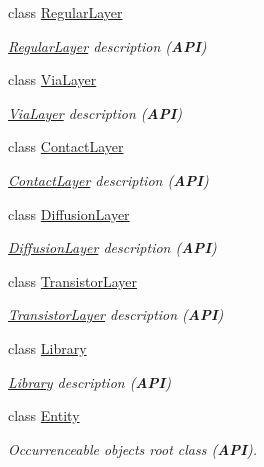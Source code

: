 \begin{DoxyCompactItemize}
class \hyperlink{classHurricane_1_1RegularLayer}{Regular\-Layer}
\begin{DoxyCompactList}\small\item\em \hyperlink{classHurricane_1_1RegularLayer}{Regular\-Layer} description ({\bfseries A\-P\-I}) \end{DoxyCompactList}\item 
class \hyperlink{classHurricane_1_1ViaLayer}{Via\-Layer}
\begin{DoxyCompactList}\small\item\em \hyperlink{classHurricane_1_1ViaLayer}{Via\-Layer} description ({\bfseries A\-P\-I}) \end{DoxyCompactList}\item 
class \hyperlink{classHurricane_1_1ContactLayer}{Contact\-Layer}
\begin{DoxyCompactList}\small\item\em \hyperlink{classHurricane_1_1ContactLayer}{Contact\-Layer} description ({\bfseries A\-P\-I}) \end{DoxyCompactList}\item 
class \hyperlink{classHurricane_1_1DiffusionLayer}{Diffusion\-Layer}
\begin{DoxyCompactList}\small\item\em \hyperlink{classHurricane_1_1DiffusionLayer}{Diffusion\-Layer} description ({\bfseries A\-P\-I}) \end{DoxyCompactList}\item 
class \hyperlink{classHurricane_1_1TransistorLayer}{Transistor\-Layer}
\begin{DoxyCompactList}\small\item\em \hyperlink{classHurricane_1_1TransistorLayer}{Transistor\-Layer} description ({\bfseries A\-P\-I}) \end{DoxyCompactList}\item 
class \hyperlink{classHurricane_1_1Library}{Library}
\begin{DoxyCompactList}\small\item\em \hyperlink{classHurricane_1_1Library}{Library} description ({\bfseries A\-P\-I}) \end{DoxyCompactList}\item 
class \hyperlink{classHurricane_1_1Entity}{Entity}
\begin{DoxyCompactList}\small\item\em Occurrenceable objects root class ({\bfseries A\-P\-I}). \end{DoxyCompactList}\item 

\end{DoxyCompactItemize}
